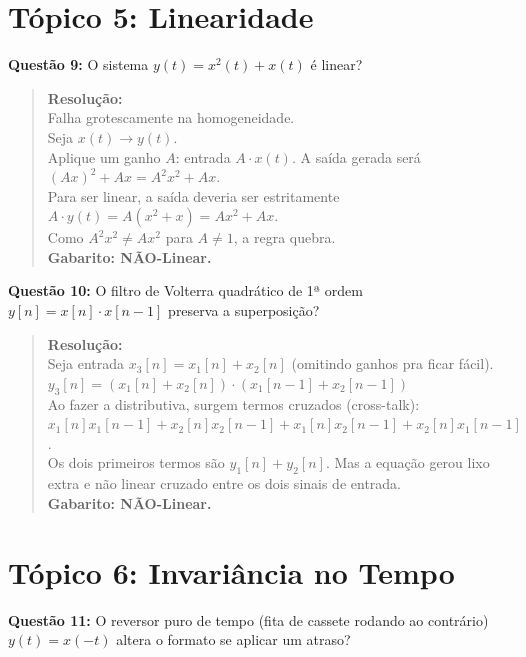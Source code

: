 \section{Tópico 5: Linearidade}\label{tuxf3pico-5-linearidade}

\textbf{Questão 9:} O sistema \(y(t) = x^2(t) + x(t)\) é linear?

\begin{quote}
\textbf{Resolução:}\\
Falha grotescamente na homogeneidade.\\
Seja \(x(t) \to y(t)\).\\
Aplique um ganho \(A\): entrada \(A \cdot x(t)\). A saída gerada será \((Ax)^2 + Ax = A^2x^2 + Ax\).\\
Para ser linear, a saída deveria ser estritamente \(A \cdot y(t) = A(x^2 + x) = Ax^2 + Ax\).\\
Como \(A^2x^2 \neq Ax^2\) para \(A \neq 1\), a regra quebra.\\
\textbf{Gabarito: NÃO-Linear.}
\end{quote}

\textbf{Questão 10:} O filtro de Volterra quadrático de 1ª ordem \(y[n] = x[n] \cdot x[n-1]\) preserva a superposição?

\begin{quote}
\textbf{Resolução:}\\
Seja entrada \(x_3[n] = x_1[n] + x_2[n]\) (omitindo ganhos pra ficar fácil).\\
\(y_3[n] = (x_1[n] + x_2[n]) \cdot (x_1[n-1] + x_2[n-1])\)\\
Ao fazer a distributiva, surgem termos cruzados (cross-talk):\\
\(x_1[n]x_1[n-1] + x_2[n]x_2[n-1] + x_1[n]x_2[n-1] + x_2[n]x_1[n-1]\).\\
Os dois primeiros termos são \(y_1[n] + y_2[n]\). Mas a equação gerou lixo extra e não linear cruzado entre os dois sinais de entrada.\\
\textbf{Gabarito: NÃO-Linear.}
\end{quote}

\section{Tópico 6: Invariância no Tempo}\label{tuxf3pico-6-invariuxe2ncia-no-tempo}

\textbf{Questão 11:} O reversor puro de tempo (fita de cassete rodando ao contrário) \(y(t) = x(-t)\) altera o formato se aplicar um atraso?

